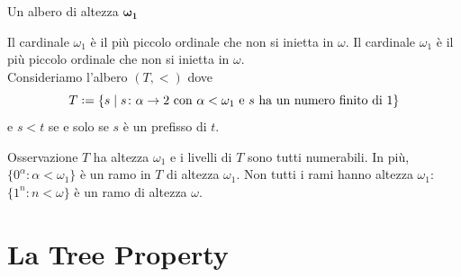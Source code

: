 \documentclass{beamer}
\theoremstyle{num.custom-title}
\theoremstyle{custom-title}
\newcommand*{\defeq}{\mathrel{\rlap{%
                     \raisebox{0.3ex}{$\cdot$}}%
                     \raisebox{-0.3ex}{$\cdot$}}%
                     =}
\begin{document}
\begin{frame}{Un albero di altezza $\pmb{\omega_1}$}

\begin{overprint}
 Il cardinale $\omega_1$ è il più piccolo ordinale che non si inietta in $\omega$.
 Il cardinale $\omega_1$ è il più piccolo ordinale che non si inietta in $\omega$.\\
Consideriamo l'albero $(T,<)$ dove
\[
T \defeq \{s \mid s \colon \alpha \to 2 \text{ con $\alpha < \omega_1$ e $s$ ha un numero finito di 1}\}
\]
e $s<t$ se e solo se $s$ è un prefisso di $t$.


\vspace{-8pt}
\begin{alertblock}{Osservazione}
$T$ ha altezza $\omega_1$ e i livelli di $T$ sono tutti numerabili. In più, $\{0^\alpha : \alpha < \omega_1\}$ è un ramo in $T$ di altezza $\omega_1$. Non tutti i rami hanno altezza $\omega_1$: $\{1^n : n < \omega\}$ è un ramo di altezza $\omega$.
\end{alertblock}
\end{overprint}

\vspace{-20pt}

\end{frame}


\section{La Tree Property}
\end{document}
